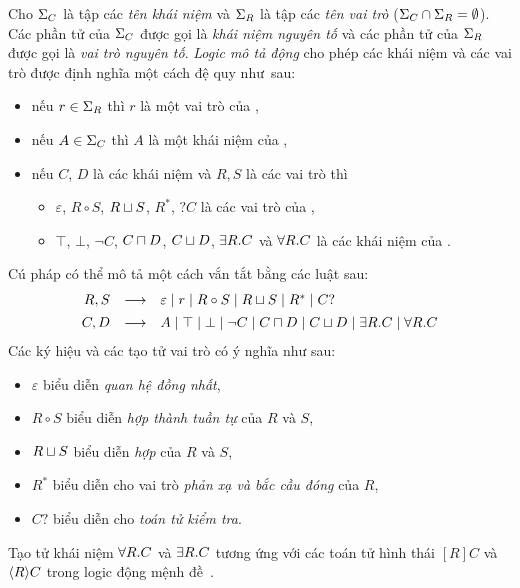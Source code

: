 \begin{Definition}
\label{def:ALCRegSyntax}
Cho $\Sigma_C$ là tập các {\em tên khái niệm} và $\Sigma_R$ là tập các {\em tên vai trò} ($\Sigma_C \cap \Sigma_R = \emptyset$). Các phần tử của $\Sigma_C$ được gọi là {\em khái niệm nguyên tố} và các phần tử của $\Sigma_R$ được gọi là {\em vai trò nguyên tố}. {\em Logic mô tả động} \ALCreg cho phép các khái niệm và các vai trò được định nghĩa một cách đệ quy như~sau:
\begin{itemize}
	\item nếu $r \in \Sigma_R$ thì $r$ là một vai trò của \ALCreg,
	\item nếu $A \in \Sigma_C$ thì $A$ là một khái niệm của \ALCreg,
	\item nếu $C$, $D$ là các khái niệm và $R, S$ là các vai trò thì 
	\begin{itemize}
		\item $\varepsilon$, $R \circ S$, $R \sqcup S$, $R^*$, $?C$ là các vai trò của \ALCreg,
		\item $\top$, $\bot$, $\neg C$, $C \sqcap D$, $C \sqcup D$, $\exists R.C$ và $\forall R.C$ là các khái niệm của \ALCreg.\myend
	\end{itemize}
\end{itemize}
\end{Definition}
%
\noindent
Cú pháp \ALCreg có thể mô tả một cách vắn tắt bằng các luật sau:
\[
	\begin{array}{r c l}
		R, S & \longrightarrow &
		\varepsilon \mid
		r \mid 
		R \circ S \mid
		R \mor S \mid
		R^* \mid
		C?\\[1ex]
%
		C, D & \longrightarrow &
		A \mid 
		\top \mid 
		\bot \mid 
		\neg C \mid 
		C \mand D \mid 
		C \mor D \mid 
		\E R.C \mid
		\V R.C
	\end{array}
\]
%
Các ký hiệu và các tạo tử vai trò có ý nghĩa như sau:
\begin{itemize}
	\item $\varepsilon$ biểu diễn {\em quan hệ đồng nhất},
	\item $R \circ S$ biểu diễn {\em hợp thành tuần tự} của $R$ và $S$,
	\item $R \sqcup S$ biểu diễn {\em hợp} của $R$ và $S$,
	\item $R^*$ biểu diễn cho vai trò {\em phản xạ và bắc cầu đóng} của $R$,
	\item $C?$ biểu diễn cho {\em toán tử kiểm tra}.
\end{itemize}

Tạo tử khái niệm $\forall R.C$ và $\exists R.C$ tương ứng với các toán tử hình thái $[R]C$ và $\left\langle R\right\rangle\!C$ trong logic động mệnh đề~\cite{Nguyen2013}.

